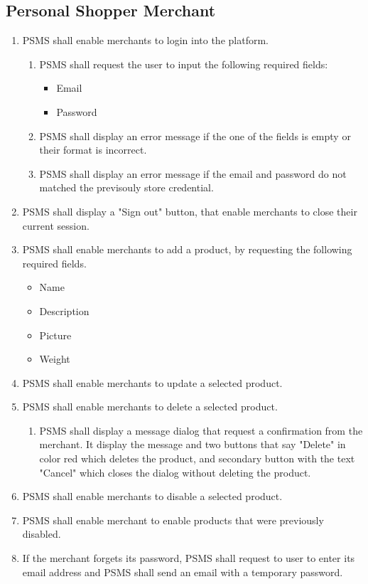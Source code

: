 \subsection{Personal Shopper Merchant}
\begin{enumerate}[resume, label=SY-\arabic*]
    \item PSMS shall enable merchants to login into the platform.
    \begin{enumerate}[label=SY20-\arabic*]
        \item PSMS shall request the user to input the following required 
        fields:
        \begin{itemize}
            \item Email
            \item Password
        \end{itemize}
        \item PSMS shall display an error message if the one of the fields is 
        empty or their format is incorrect.
        \item PSMS shall display an error message if the email and password 
        do not matched the previsouly store credential.
    \end{enumerate}
    \item PSMS shall display a "Sign out" button, that enable merchants to 
    close their current session.
    \item PSMS shall enable merchants to add a product, by requesting the 
    following required fields.
    \begin{itemize}
        \item Name
        \item Description
        \item Picture
        \item Weight
    \end{itemize}
    \item PSMS shall enable merchants to update a selected product.
    \item PSMS shall enable merchants to delete a selected product.
    \begin{enumerate}[label=SY24-\arabic*]
        \item PSMS shall display a message dialog that request a confirmation 
        from the merchant. It display the message and two buttons that say
        "Delete" in color red which deletes the product, and secondary button 
        with the text "Cancel" which closes the dialog without deleting the 
        product.
    \end{enumerate}
    \item PSMS shall enable merchants to disable a selected product.
    \item PSMS shall enable merchant to enable products that were 
    previously disabled.
    \item If the merchant forgets its password, PSMS shall request to user 
    to enter its email address and PSMS shall send an email with a 
    temporary password.
\end{enumerate}
\pagebreak
